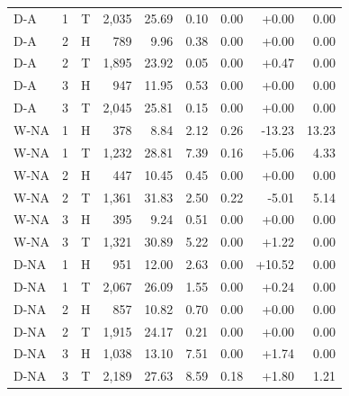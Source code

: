 \begin{table}[htbp]
\begin{tabular}{llcrrrrrr}
D-A & 1 & T & 2,035 & 25.69 & 0.10 & 0.00 & +0.00 & 0.00\\
D-A & 2 & H & 789 & 9.96 & 0.38 & 0.00 & +0.00 & 0.00\\
D-A & 2 & T & 1,895 & 23.92 & 0.05 & 0.00 & +0.47 & 0.00\\
D-A & 3 & H & 947 & 11.95 & 0.53 & 0.00 & +0.00 & 0.00\\
D-A & 3 & T & 2,045 & 25.81 & 0.15 & 0.00 & +0.00 & 0.00\\
W-NA & 1 & H & 378 & 8.84 & 2.12 & 0.26 & -13.23 & 13.23\\
W-NA & 1 & T & 1,232 & 28.81 & 7.39 & 0.16 & +5.06 & 4.33\\
W-NA & 2 & H & 447 & 10.45 & 0.45 & 0.00 & +0.00 & 0.00\\
W-NA & 2 & T & 1,361 & 31.83 & 2.50 & 0.22 & -5.01 & 5.14\\
W-NA & 3 & H & 395 & 9.24 & 0.51 & 0.00 & +0.00 & 0.00\\
W-NA & 3 & T & 1,321 & 30.89 & 5.22 & 0.00 & +1.22 & 0.00\\
D-NA & 1 & H & 951 & 12.00 & 2.63 & 0.00 & +10.52 & 0.00\\
D-NA & 1 & T & 2,067 & 26.09 & 1.55 & 0.00 & +0.24 & 0.00\\
D-NA & 2 & H & 857 & 10.82 & 0.70 & 0.00 & +0.00 & 0.00\\
D-NA & 2 & T & 1,915 & 24.17 & 0.21 & 0.00 & +0.00 & 0.00\\
D-NA & 3 & H & 1,038 & 13.10 & 7.51 & 0.00 & +1.74 & 0.00\\
D-NA & 3 & T & 2,189 & 27.63 & 8.59 & 0.18 & +1.80 & 1.21\\
\bottomrule
\end{tabular}
\end{table}
